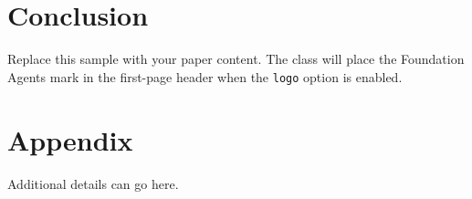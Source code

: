 \documentclass[11pt, a4paper, logo, copyright]{foundationagents}
\theoremstyle{plain}
\theoremstyle{definition}
\begin{document}
\section{Conclusion}

Replace this sample with your paper content. The class will place the
Foundation Agents mark in the first-page header when the \texttt{logo} option is
enabled.




\newpage
\appendix
\section{Appendix}

Additional details can go here.
\end{document}
